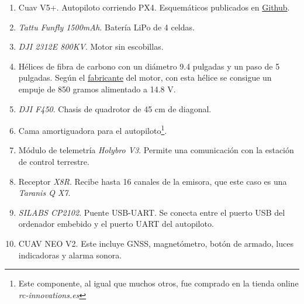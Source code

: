\begin{enumerate}
\item Cuav V5+. Autopiloto corriendo PX4. Esquemáticos publicados en \href{https://github.com/ArduPilot/Schematics/tree/master/CUAV/V5_Autopilot/V5\%2B}{Github}.
\item \textit{Tattu Funfly 1500mAh}. Batería LiPo de 4 celdas.
\item \textit{DJI 2312E 800KV}. Motor sin escobillas.
\item Hélices de fibra de carbono con un diámetro 9.4 pulgadas y un paso de 5 pulgadas. Según el \href{https://www.dji.com/e305/spec}{fabricante} del motor, con esta hélice se consigue un empuje de 850 gramos alimentado a 14.8 V.
\item \textit{DJI F450}. Chasis de quadrotor de 45 cm de diagonal. 
\item Cama amortiguadora para el autopiloto\footnote{Este componente, al igual que muchos otros, fue comprado en la tienda online \textit{rc-innovations.es}}.
\item Módulo de telemetría \textit{Holybro V3}. Permite una comunicación con la estación de control terrestre.
\item Receptor \textit{X8R}. Recibe hasta 16 canales de la emisora, que este caso es una \textit{Taranis Q X7}. 
\item \textit{SILABS CP2102}. Puente USB-UART. Se conecta entre el puerto USB del ordenador embebido y el puerto UART del autopiloto.
\item CUAV NEO V2. Este incluye GNSS, magnetómetro, botón de armado, luces indicadoras y alarma sonora.


\end{enumerate}
